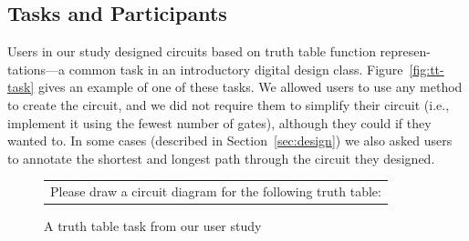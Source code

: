 \documentclass{elsart}
\begin{document}
\subsection{Tasks and Participants}
Users in our study designed circuits based on truth table function
represen-tations---a common task in an introductory digital design
class.  Figure~\ref{fig:tt-task} gives an example of one of these
tasks.  We allowed users to use any method to create the circuit,
and we did not require them to simplify their circuit (i.e., implement
it using the fewest number of gates), although they could if they
wanted to.  In some cases (described in Section~\ref{sec:design}) we
also asked users to annotate the shortest and longest path through the
circuit they designed.



 \begin{figure}[tb]
 \centering
 \begin{tabular}{p{.85\linewidth}}
 	Please draw a circuit diagram for the following truth table:
 	\end{tabular}

 	\caption{ A truth table task from our user study}
	\label{fig:task}
 \end{figure}
\end{document}
